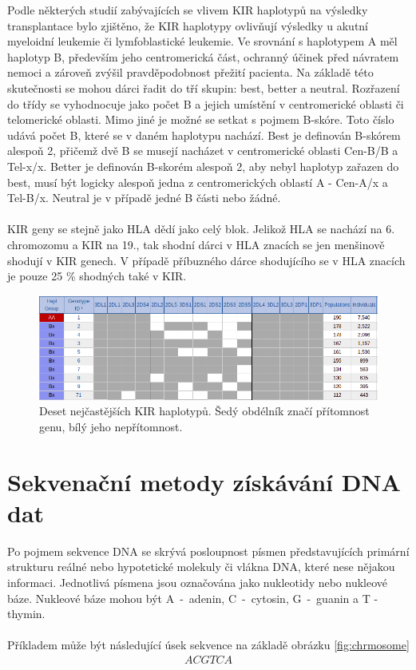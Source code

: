 \documentclass[czech,DP]{thesiskiv}
\numberwithin{equation}{section}
\begin{document}
\noindent
Podle některých studií zabývajících se vlivem KIR haplotypů na výsledky transplantace bylo zjištěno, že KIR haplotypy ovlivňují výsledky u akutní myeloidní leukemie či  lymfoblastické leukemie. Ve srovnání s haplotypem A měl haplotyp B, především jeho centromerická část, ochranný účinek před návratem nemoci a zároveň zvýšil pravděpodobnost přežití pacienta. Na základě této skutečnosti se mohou dárci řadit do tří skupin: best, better a neutral. Rozřazení do třídy se vyhodnocuje jako počet B a jejich umístění v centromerické oblasti či telomerické oblasti. Mimo jiné je možné se setkat s pojmem B-skóre. Toto číslo udává počet B, které se v daném haplotypu nachází. Best je definován B-skórem alespoň 2, přičemž dvě B se musejí nacházet v centromerické oblasti Cen-B/B a Tel-x/x. Better je definován B-skorém alespoň 2, aby nebyl haplotyp zařazen do best, musí být logicky alespoň jedna z centromerických oblastí A - Cen-A/x a Tel-B/x. Neutral je v případě jedné B části nebo žádné. \cite{KIR_haplotypy}
\\
\\
KIR geny se stejně jako HLA dědí jako celý blok. Jelikož HLA se nachází na 6. chromozomu a KIR na 19., tak shodní dárci v HLA znacích se jen menšinově shodují v KIR genech. V případě příbuzného dárce shodujícího se v HLA znacích je pouze 25 \% shodných také v KIR. \cite{KIR_haplotypy}

\begin{figure}[H]		
		\centering
		\includegraphics[width=\textwidth]{./img/KIR_haplotypy_priklad.png}
		\caption{Deset nejčastějších KIR haplotypů. Šedý obdélník značí přítomnost genu, bílý jeho nepřítomnost. \cite{kir_genotypes_10}}
		\label{fig:kir_haplotypy_10}
\end{figure}
 

\chapter{Sekvenační metody získávání DNA dat}
Po pojmem sekvence DNA se skrývá posloupnost písmen představujících primární strukturu reálné nebo hypotetické molekuly či vlákna DNA, které nese nějakou informaci. Jednotlivá písmena jsou označována jako nukleotidy nebo nukleové báze. Nukleové báze mohou být A~-~adenin, C~-~cytosin, G~-~guanin a T - thymin. \cite{genome_gov}
\\
\\
\noindent
Příkladem může být následující úsek sekvence na základě obrázku \ref{fig:chrmosome} 
\begin{align}
   \label{sekvence_prikad} ACGTCA
\end{align}
\end{document}
